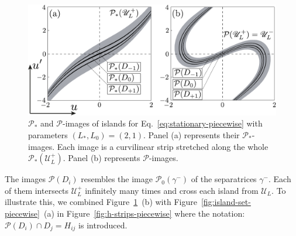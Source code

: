 \begin{figure}[h]
\centering
	\includegraphics[scale = 1]{pic/Poincare map of islands for piecewise equation}
	\caption{
		$\mathcal{P}_*$ and $\mathcal{P}$-images of islands for Eq.~\eqref{eq:stationary-piecewise} with parameters $(L_*, L_0) = (2, 1)$.
		Panel (a) represents their $\mathcal{P}_*$-images.
		Each image is a curvilinear strip stretched along the whole $\mathcal{P}_*(\mathscr{U}_L^+)$.
		Panel (b) represents $\mathcal{P}$-images.
	}
\label{fig:map-of-islands-piecewise}
\end{figure}

The images $\mathcal{P}(D_i)$ resembles the image $\mathcal{P}_0(\gamma^-)$ of the separatrices $\gamma^-$.
Each of them intersects $\mathscr{U}_L^+$ infinitely many times and cross each island from $\mathscr{U}_L$.
To illustrate this, we combined Figure~\ref{fig:map-of-islands-piecewise}~(b) with Figure~\ref{fig:island-set-piecewise}~(a) in Figure~\ref{fig:h-strips-piecewise} where the notation: $\mathcal{P}(D_i) \cap D_j = H_{ij}$ is introduced.

